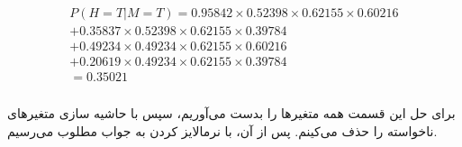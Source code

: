 \documentclass{university}
\begin{document}
\subsubsection{}
\begin{gather*}
    P(H=T|M=T) = 0.95842 \times 0.52398 \times 0.62155 \times 0.60216 \\
    + 0.35837 \times 0.52398 \times 0.62155 \times 0.39784 \\
    + 0.49234 \times 0.49234 \times 0.62155 \times 0.60216 \\
    + 0.20619 \times 0.49234 \times 0.62155 \times 0.39784 \\
    = 0.35021
\end{gather*}

\subsubsection{}
برای حل این قسمت 
همه متغیرها را بدست می‌آوریم، سپس با حاشیه سازی متغیرهای ناخواسته را حذف می‌کینم. 
پس از آن، با نرمالایز کردن به جواب مطلوب می‌رسیم. 
\end{document}

